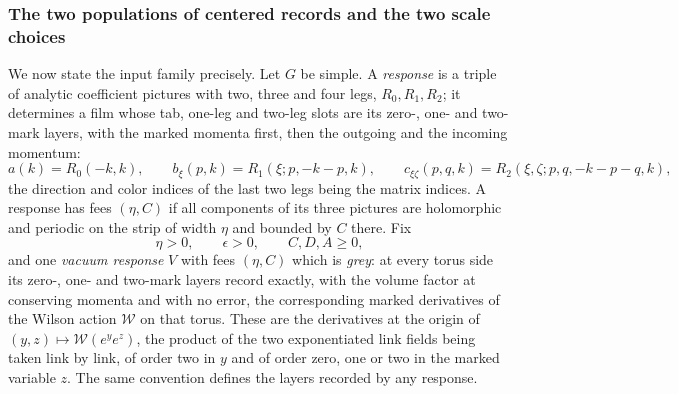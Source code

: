 \subsubsection{The two populations of centered records and the two scale choices}

We now state the input family precisely. Let $G$ be simple. A
\emph{response} is a triple of analytic coefficient pictures with two,
three and four legs, $R_0,R_1,R_2$; it determines a film whose tab,
one-leg and two-leg slots are its zero-, one- and two-mark layers,
with the marked momenta first, then the outgoing and the incoming
momentum:
\[
 a(k)=R_0(-k,k),\qquad b_\xi(p,k)=R_1(\xi;p,-k-p,k),\qquad
 c_{\xi\zeta}(p,q,k)=R_2(\xi,\zeta;p,q,-k-p-q,k),
\]
the direction and color indices of the last two legs being the matrix
indices. A response has fees
$(\eta,C)$ if all components of its three pictures are holomorphic and
periodic on the strip of width $\eta$ and bounded by $C$ there. Fix
\[
 \eta>0,\qquad \epsilon>0,\qquad C,D,A\geq0,
\]
and one \emph{vacuum response} $V$ with fees $(\eta,C)$ which is
\emph{grey}: at every torus side its zero-, one- and two-mark layers
record exactly, with the volume factor at conserving momenta and with
no error, the corresponding marked derivatives of the Wilson action
$\mathcal W$ on that torus. These are the derivatives at the origin of
$(y,z)\mapsto\mathcal W(e^{y}e^{z})$, the product of the two
exponentiated link fields being taken link by link, of order two in
$y$ and of order zero, one or two in the marked variable $z$. The same
convention defines the layers recorded by any response.

